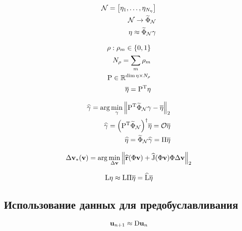 \begin{align}
    \mathcal{N} =
    \begin{bmatrix}
        \nlin_1, \dots,  \nlin_{N_\nlin}
    \end{bmatrix} \\
    \mathcal{N} \rightarrow \widetilde{\Phi}_\mathcal{N} \\
    \nlin \approx \widetilde{\Phi}_\mathcal{N} \bvec{\gamma}
\end{align}

\begin{align}
   \bvec{\rho} : \rho_m \in \left\{0, 1 \right\} \\
   N_{\bvec{\rho}} = \sum_m \rho_m \\
   \matr{P} \in \mathbb{R}^{\dim{\nlin} \times N_{\bvec{\rho}}} \\
   \overline{\nlin} = \transpose{P} \nlin
\end{align}

\begin{align}
    \widehat{\bvec{\gamma}} = \arg \min_{\bvec{\gamma}} \norm[2]{\transpose{P} \widetilde{\Phi}_\mathcal{N} \bvec{\gamma} - \overline{\nlin}} \\
    \widehat{\bvec{\gamma}} = {\left( \transpose{P} \widetilde{\Phi}_\mathcal{N} \right)}^\dagger \overline{\nlin} = \mathcal{O} \overline{\nlin} \\
    \widehat{\nlin} = \widetilde{\Phi}_\mathcal{N} \widehat{\bvec{\gamma}} = \matr{\Pi} \overline{\nlin}
\end{align}


\begin{align}
    \dvunk_\ast (\vunk)= \arg \min_{\dvunk} \norm[2]{\widehat{\resid}(\Phi \vunk) + \widehat{\jac}(\Phi \vunk) \Phi \dvunk}
\end{align}

\begin{align}
    \matr{\matr{L}} \nlin \approx
    \matr{\matr{L}} \matr{\Pi} \overline{\nlin} = \widehat{\matr{\matr{L}}} \overline{\nlin}
\end{align}

\subsection{Использование данных для предобуславливания}

\begin{equation}
    \unk_{n+1} \approx \matr{D} \unk_{n}
\end{equation}

